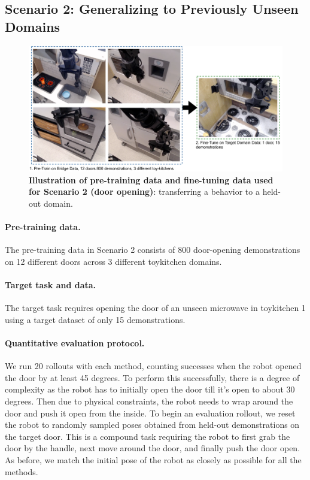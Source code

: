 \documentclass[../thesis.tex]{subfiles}
\begin{document}
\subsection{Scenario 2: Generalizing to Previously Unseen Domains}

\begin{figure}
\centering
  \includegraphics[width=0.83\linewidth]{chapters/ptr/scenario2_overview.pdf}
  \caption{\footnotesize \textbf{Illustration of pre-training data and fine-tuning data used for Scenario 2 (door opening)}: transferring a behavior to a held-out domain.}
  \vspace{-0.5cm}
  \label{fig:door_open_setup}
\end{figure}


\paragraph{Pre-training data.} The pre-training data in Scenario 2 consists of 800 door-opening demonstrations on 12 different doors across 3 different toykitchen domains.

\paragraph{Target task and data.} The target task requires opening the door of an unseen microwave in toykitchen 1 using a target dataset of only 15 demonstrations.

\paragraph{Quantitative evaluation protocol.} We run 20 rollouts with each method, counting successes when the robot opened the door by at least 45 degrees. To perform this successfully, there is a degree of complexity as the robot has to initially open the door till it's open to about 30 degrees. Then due to physical constraints, the robot needs to wrap around the door and push it open from the inside. To begin an evaluation rollout, we reset the robot to randomly sampled poses obtained from held-out demonstrations on the target door.  This is a compound task requiring the robot to first grab the door by the handle, next move around the door, and finally push the door open. As before, we match the initial pose of the robot as closely as possible for all the methods. 
\end{document}
